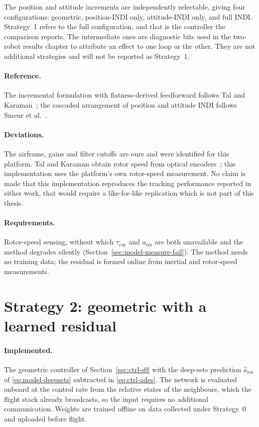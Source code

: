 The position and attitude increments are independently selectable, giving four configurations:
geometric, position-INDI only, attitude-INDI only, and full INDI. Strategy~1 refers to the full
configuration, and that is the controller the comparison reports. The intermediate ones are
diagnostic bits used in the two-robot results chapter to attribute an effect to one loop or the
other. They are not additional strategies and will not be reported as Strategy~1.

\paragraph{Reference.} The incremental formulation with flatness-derived
feedforward follows Tal and Karaman~\cite{tal2018indi}; the cascaded arrangement of position and
attitude INDI follows Smeur et al.~\cite{smeur2017cascadedindi}.

\paragraph{Deviations.} The airframe, gains and filter cutoffs are ours and were identified for
this platform. Tal and Karaman obtain rotor speed from optical encoders~\cite{tal2018indi}; this
implementation uses the platform's own rotor-speed measurement. No claim is made that this
implementation reproduces the tracking performance reported in either work, that would require a
like-for-like replication which is not part of this thesis.

\paragraph{Requirements.} Rotor-speed sensing, without which $\tau_{\mathrm{cur}}$ and
$a_{\mathrm{res}}$ are both unavailable and the method degrades silently
(Section~\ref{sec:model-measure-fail}). The method needs no training data; the residual is formed
online from inertial and rotor-speed measurements.

\section{Strategy 2: geometric with a learned residual}
\label{sec:ctrl-s2}

\paragraph{Implemented.} The geometric controller of Section~\ref{sec:ctrl-s0} with the deep-sets
prediction $\hat{a}_{\mathrm{res}}$ of \eqref{eq:model-deepsets} subtracted in
\eqref{eq:ctrl-ades}. The network is evaluated onboard at the control rate from the relative states
of the neighbours, which the flight stack already broadcasts, so the input requires no additional
communication. Weights are trained offline on data collected under Strategy~0 and uploaded before
flight.

